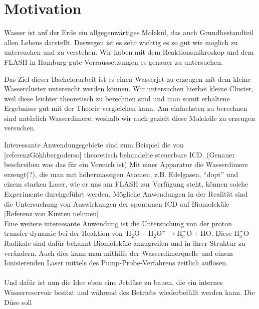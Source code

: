 
  \chapter{Motivation} 
  
  Wasser ist auf der Erde ein allgegenwärtiges Molekül, das auch Grundbestandteil allen Lebens darstellt. Deswegen ist es sehr wichtig es so gut wie möglich zu untersuchen und zu verstehen. Wir haben mit dem Reaktionsmikroskop und dem FLASH in Hamburg gute Vorraussetzungen es genauer zu untersuchen.
  
  Das Ziel dieser Bachelorarbeit ist es einen Wasserjet zu erzeugen mit dem kleine Wassercluster untersucht werden können. Wir untersuchen hierbei kleine Cluster, weil diese leichter theoretisch zu berechnen sind und man somit erhaltene Ergebnisse gut mit der Theorie vergleichen kann. Am einfachsten zu berechnen sind natürlich Wasserdimere, weshalb wir auch gezielt diese Moleküle zu erzeugen versuchen.
  
  Interessante Anwendungsgebiete sind zum Beispiel die von [referenzGökhbergoderso] theoretisch behandelte steuerbare ICD. (Genauer beschreiben was das für ein Versuch ist) Mit einer Apparatur die Wasserdimere erzeugt(?), die man mit höhermassigen Atomen, z.B. Edelgasen, \enquote{dopt} und einem starken Laser, wie er uns am FLASH zur Verfügung steht, können solche Experimente durchgeführt werden. Mögliche Anwendungen in der Realität sind die Untersuchung von Auswirkungen der spontanen ICD auf Biomoleküle [Referenz von Kirsten nehmen]\\
  Eine weitere interessante Anwendung ist die Untersuchung von der proton transfer dynamic bei der Reaktion von\  $\mathrm{H}_2\mathrm{O} +  \mathrm{H}_2\mathrm{O}^{+} \rightarrow  \mathrm{H}_3^{+}\mathrm{O} + \mathrm{H}\mathrm{O}$. Diese $\mathrm{H}_3^{+}\mathrm{O}$ - Radikale sind dafür bekannt Biomoleküle anzugreifen und in ihrer Struktur zu verändern. Auch dies kann man mithilfe der Wasserdimerquelle und einem Ionisierenden Laser mittels des Pump-Probe-Verfahrens zeitlich auflösen.\\
  \\
  Und dafür ist nun die Idee eben eine Jetdüse zu bauen, die ein internes Wasserreservoir besitzt und während des Betriebs wiederbefüllt werden kann. Die Düse soll 
 
